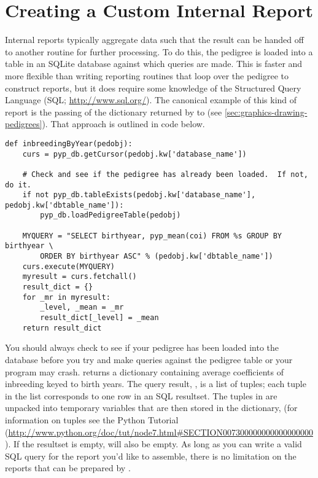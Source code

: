 \section{Creating a Custom Internal Report}
\label{sec:reports-custom-internal-reports}
Internal reports  typically aggregate data such that the result can be handed off to another \PyPedal{} routine for further processing.   To do this, the pedigree is loaded into a table in an SQLite database against which queries are made.  This is faster and more flexible than writing reporting routines that loop over the pedigree to construct reports, but it does require some knowledge of the Structured Query Language (SQL; \url{http://www.sql.org/}).  The canonical example of this kind of report is the passing of the dictionary returned by  to  (see \ref{sec:graphics-drawing-pedigrees}).  That approach is outlined in code below.
\begin{verbatim}
def inbreedingByYear(pedobj):
    curs = pyp_db.getCursor(pedobj.kw['database_name'])

    # Check and see if the pedigree has already been loaded.  If not, do it.
    if not pyp_db.tableExists(pedobj.kw['database_name'], pedobj.kw['dbtable_name']):
        pyp_db.loadPedigreeTable(pedobj)

    MYQUERY = "SELECT birthyear, pyp_mean(coi) FROM %s GROUP BY birthyear \
        ORDER BY birthyear ASC" % (pedobj.kw['dbtable_name'])
    curs.execute(MYQUERY)
    myresult = curs.fetchall()
    result_dict = {}
    for _mr in myresult:
        _level, _mean = _mr
        result_dict[_level] = _mean
    return result_dict
\end{verbatim}
You should always check to see if your pedigree has been loaded into the database before you try and make queries against the pedigree table or your program may crash.   returns a dictionary containing average coefficients of inbreeding keyed to birth years.  The query result, , is a list of tuples; each tuple in the list
corresponds to one row in an SQL resultset. The tuples in  are unpacked into temporary variables that are then stored in the dictionary,  (for information on tuples see the Python Tutorial (\url{http://www.python.org/doc/tut/node7.html#SECTION007300000000000000000}).  If the resultset is empty,  will also be empty.  As long as you can write a valid SQL query for the report you'd like to assemble, there is no limitation on the reports that can be prepared by \PyPedal{}.
